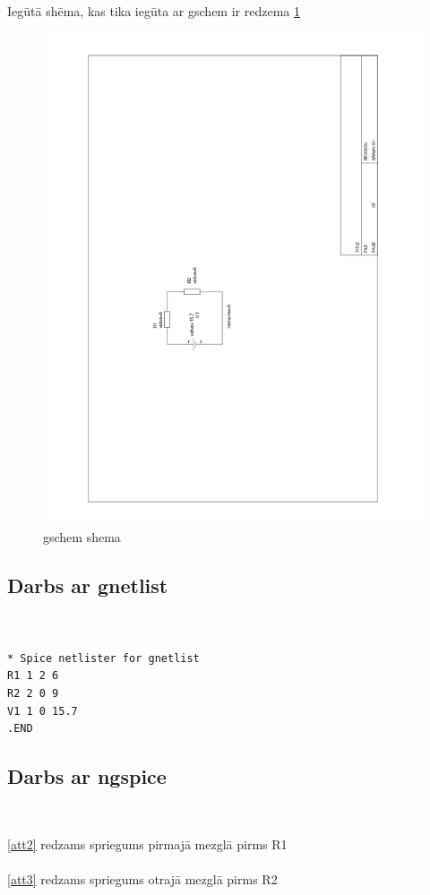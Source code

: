 \documentclass{report}
\begin{document}
Iegūtā shēma, kas tika iegūta ar gschem ir redzema \ref{att1}
\begin{figure}[h]
    \includegraphics[scale=0.5, angle=-90]{01.png}
    \caption{gschem shema}
    \label{att1}
\end{figure}


\subsection{Darbs ar gnetlist}
\begin{verbatim}


* Spice netlister for gnetlist
R1 1 2 6
R2 2 0 9
V1 1 0 15.7
.END
\end{verbatim}


\subsection{Darbs ar ngspice}
\begin{verbatim}
\end{verbatim}\\
\ref{att2} redzams spriegums pirmajā mezglā pirms R1\\\\
\ref{att3} redzams spriegums otrajā mezglā pirms R2\\
\end{document}
